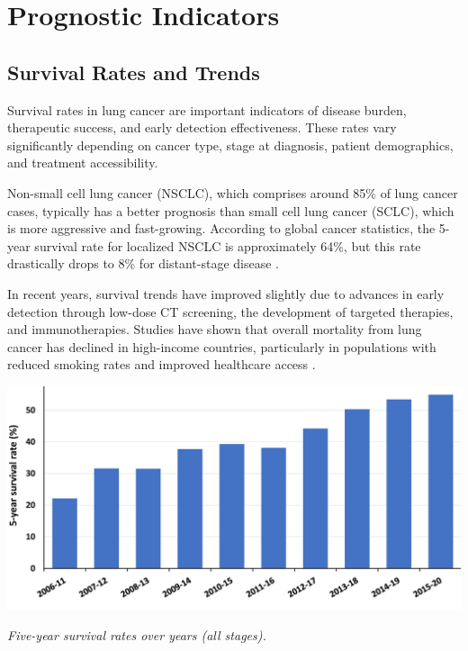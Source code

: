 \section{Prognostic Indicators}

\subsection{Survival Rates and Trends}

Survival rates in lung cancer are important indicators of disease burden, therapeutic success, and 
early detection effectiveness. These rates vary significantly depending on cancer type, stage at 
diagnosis, patient demographics, and treatment accessibility.

Non-small cell lung cancer (NSCLC), which comprises around 85\% of lung cancer cases, typically has 
a better prognosis than small cell lung cancer (SCLC), which is more aggressive and fast-growing. 
According to global cancer statistics, the 5-year survival rate for localized NSCLC is approximately 
64\%, but this rate drastically drops to 8\% for distant-stage disease \cite{cancerstats2023}.

In recent years, survival trends have improved slightly due to advances in early detection through 
low-dose CT screening, the development of targeted therapies, and immunotherapies. Studies have 
shown that overall mortality from lung cancer has declined in high-income countries, particularly in 
populations with reduced smoking rates and improved healthcare access \cite{siegeletc2022trends}.

\vspace{1em}
\begin{center}
    \includegraphics[width=1.00\textwidth]{../assets/05-prognosis/survival-rates.jpg}

    \small\textit{Five-year survival rates over years (all stages). \cite{osarogiagbon2023stage}}
\end{center}
\vspace{1em}

